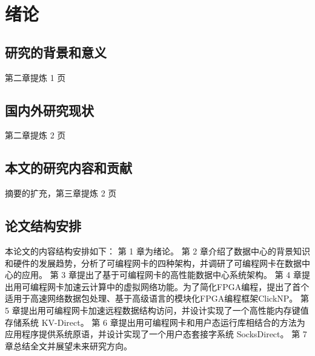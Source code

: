 \chapter{绪论}

\section{研究的背景和意义}

第二章提炼 1 页

\section{国内外研究现状}

第二章提炼 2 页

\section{本文的研究内容和贡献}

摘要的扩充，第三章提炼 2 页

\section{论文结构安排}

本论⽂的内容结构安排如下：
第 1 章为绪论。
第 2 章介绍了数据中心的背景知识和硬件的发展趋势，分析了可编程网卡的四种架构，并调研了可编程网卡在数据中心的应用。
第 3 章提出了基于可编程网卡的高性能数据中心系统架构。
第 4 章提出用可编程网卡加速云计算中的虚拟网络功能。为了简化FPGA编程，提出了首个适用于高速网络数据包处理、基于高级语言的模块化FPGA编程框架ClickNP。
第 5 章提出用可编程网卡加速远程数据结构访问，并设计实现了一个高性能内存键值存储系统 KV-Direct。
第 6 章提出用可编程网卡和用户态运行库相结合的方法为应用程序提供系统原语，并设计实现了一个用户态套接字系统 SocksDirect。
第 7 章总结全⽂并展望未来研究方向。